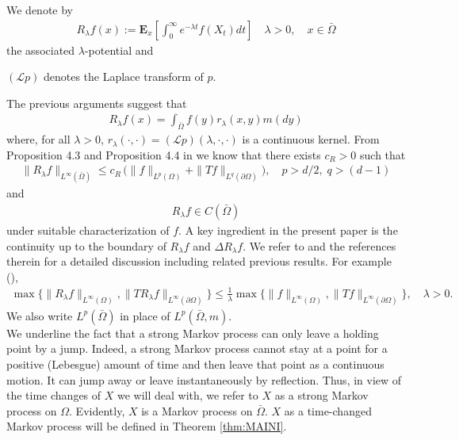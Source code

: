 \documentclass[11pt,a4paper]{article}
\begin{document}
We denote by 
\begin{align*}
R_\lambda f(x) := \mathbf{E}_x \left[ \int_0^\infty e^{-\lambda t} f(X_t) dt \right] \quad \lambda>0, \quad x \in \bar{\Omega}
\end{align*}
the associated $\lambda$-potential and
\begin{center}
$(\mathcal{L}p)$ denotes the Laplace transform of $p$.
\end{center}
The previous arguments suggest that
\begin{align*}
R_\lambda f(x) = \int_{\bar{\Omega}} f(y) r_\lambda(x,y) m(dy)
\end{align*}
where, for all $\lambda >0$,  $r_\lambda(\cdot, \cdot) = (\mathcal{L} p)(\lambda, \cdot, \cdot)$ is a continuous kernel. From Proposition 4.3 and Proposition 4.4 in \cite{ArendtSauter2022} we know that there exists $c_R>0$ such that
\begin{align*}
\| R_\lambda f \|_{L^\infty(\bar{\Omega})}  \leq c_R\, \big( \| f \|_{L^p(\Omega)} + \| Tf \|_{L^q(\partial \Omega)} \big), \quad p>d/2,\; q > (d-1)
\end{align*}
and 
\begin{align*}
R_\lambda f \in C(\bar{\Omega})
\end{align*}
under suitable characterization of $f$. A key ingredient in the present paper is the continuity up to the boundary of $R_\lambda f$ and $\Delta R_\lambda f$. We refer to \cite{ArendtSauter2022} and the references therein for a detailed discussion including related previous results. For example (\cite{AMPR03}), 
\begin{align*}
\max\{ \|R_\lambda f\|_{L^\infty(\Omega)}, \| TR_\lambda f \|_{L^\infty(\partial \Omega)}\} \leq \frac{1}{\lambda} \max\{ \|f\|_{L^\infty(\Omega)}, \| Tf \|_{L^\infty(\partial \Omega)}\}, \quad \lambda>0.
\end{align*}
We also write $L^p(\bar{\Omega})$ in place of $L^p(\bar{\Omega},m)$.\\



We underline the fact that a strong Markov process can only leave a holding point by a jump. Indeed, a strong Markov process cannot stay at a point for a positive (Lebesgue) amount of time and then leave that point as a continuous motion. It can jump away or leave instantaneously by reflection. Thus, in view of the time changes of $X$ we will deal with, we refer to $X$ as a strong Markov process on $\Omega$. Evidently, $X$ is a Markov process on $\bar{\Omega}$. $X$ as a time-changed Markov process will be defined in Theorem \ref{thm:MAINI}.
\end{document}

